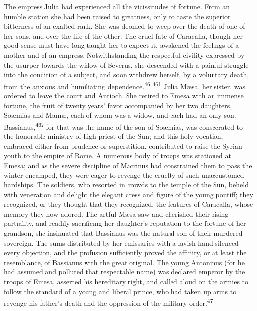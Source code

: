 
The empress Julia had experienced all the vicissitudes of
fortune. From an humble station she had been raised to greatness,
only to taste the superior bitterness of an exalted rank. She was
doomed to weep over the death of one of her sons, and over the
life of the other. The cruel fate of Caracalla, though her good
sense must have long taught her to expect it, awakened the
feelings of a mother and of an empress. Notwithstanding the
respectful civility expressed by the usurper towards the widow of
Severus, she descended with a painful struggle into the condition
of a subject, and soon withdrew herself, by a voluntary death,
from the anxious and humiliating dependence.\textsuperscript{46} \textsuperscript{461} Julia Mæsa,
her sister, was ordered to leave the court and Antioch. She
retired to Emesa with an immense fortune, the fruit of twenty
years’ favor accompanied by her two daughters, Soæmias and Mamæ,
each of whom was a widow, and each had an only son. Bassianus,\textsuperscript{462}
for that was the name of the son of Soæmias, was consecrated
to the honorable ministry of high priest of the Sun; and this
holy vocation, embraced either from prudence or superstition,
contributed to raise the Syrian youth to the empire of Rome. A
numerous body of troops was stationed at Emesa; and as the severe
discipline of Macrinus had constrained them to pass the winter
encamped, they were eager to revenge the cruelty of such
unaccustomed hardships. The soldiers, who resorted in crowds to
the temple of the Sun, beheld with veneration and delight the
elegant dress and figure of the young pontiff; they recognized,
or they thought that they recognized, the features of Caracalla,
whose memory they now adored. The artful Mæsa saw and cherished
their rising partiality, and readily sacrificing her daughter’s
reputation to the fortune of her grandson, she insinuated that
Bassianus was the natural son of their murdered sovereign. The
sums distributed by her emissaries with a lavish hand silenced
every objection, and the profusion sufficiently proved the
affinity, or at least the resemblance, of Bassianus with the
great original. The young Antoninus (for he had assumed and
polluted that respectable name) was declared emperor by the
troops of Emesa, asserted his hereditary right, and called aloud
on the armies to follow the standard of a young and liberal
prince, who had taken up arms to revenge his father’s death and
the oppression of the military order.\textsuperscript{47}

